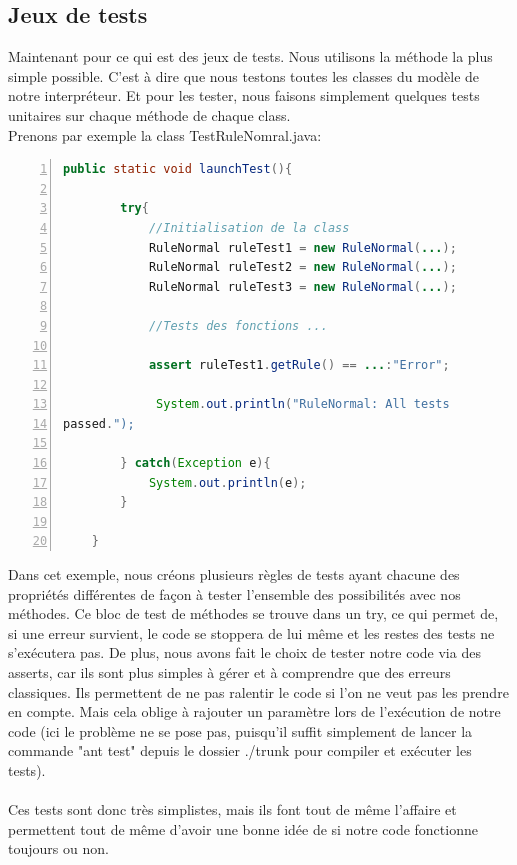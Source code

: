 \documentclass[a4paper,12pt]{article}
\begin{document}
\subsection{Jeux de tests}

Maintenant pour ce qui est des jeux de tests. Nous utilisons la méthode la plus simple possible. C'est à dire que nous testons toutes les classes du modèle de notre interpréteur. Et pour les tester, nous faisons simplement quelques tests unitaires sur chaque méthode de chaque class.
\\
Prenons par exemple la class TestRuleNomral.java:
\\
\begin{lstlisting}[language=Java, numbers=left, basicstyle=\ttfamily\footnotesize, keywordstyle=\color{blue}\ttfamily, stringstyle=\color{red}\ttfamily, commentstyle=\color{green}\ttfamily,
numberstyle=\tiny, frame=single, linewidth=12cm]
public static void launchTest(){

        try{
            //Initialisation de la class
            RuleNormal ruleTest1 = new RuleNormal(...);
            RuleNormal ruleTest2 = new RuleNormal(...);
            RuleNormal ruleTest3 = new RuleNormal(...);

            //Tests des fonctions ...

            assert ruleTest1.getRule() == ...:"Error";
            
             System.out.println("RuleNormal: All tests
passed.");

        } catch(Exception e){
            System.out.println(e);
        }

    }
\end{lstlisting}
\newpage
Dans cet exemple, nous créons plusieurs règles de tests ayant chacune des propriétés différentes de façon à tester l'ensemble des possibilités avec nos méthodes. Ce bloc de test de méthodes se trouve dans un try, ce qui permet de, si une erreur survient, le code se stoppera de lui même et les restes des tests ne s'exécutera pas. 
De plus, nous avons fait le choix de tester notre code via des asserts, car ils sont plus simples à gérer et à comprendre que des erreurs classiques. Ils permettent de ne pas ralentir le code si l'on ne veut pas les prendre en compte. Mais cela oblige à rajouter un paramètre lors de l'exécution de notre code (ici le problème ne se pose pas, puisqu'il suffit simplement de lancer la commande "ant test" depuis le dossier ./trunk pour compiler et exécuter les tests).
\\\\
Ces tests sont donc très simplistes, mais ils font tout de même l'affaire et permettent tout de même d'avoir une bonne idée de si notre code fonctionne toujours ou non.
\end{document}
